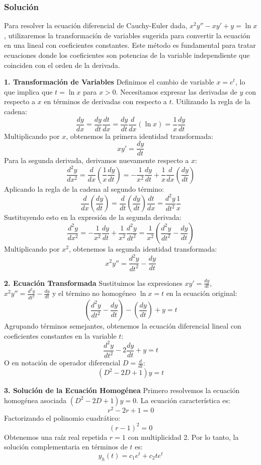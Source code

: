 \documentclass[a4paper]{article}
\begin{document}
\subsubsection{Solución}
Para resolver la ecuación diferencial de Cauchy-Euler dada, $x^2y'' - xy' + y = \ln x$, utilizaremos la transformación de variables sugerida para convertir la ecuación en una lineal con coeficientes constantes. Este método es fundamental para tratar ecuaciones donde los coeficientes son potencias de la variable independiente que coinciden con el orden de la derivada.

\textbf{1. Transformación de Variables}
Definimos el cambio de variable $x = e^t$, lo que implica que $t = \ln x$ para $x > 0$. Necesitamos expresar las derivadas de $y$ con respecto a $x$ en términos de derivadas con respecto a $t$. Utilizando la regla de la cadena:
$$
\frac{dy}{dx} = \frac{dy}{dt} \frac{dt}{dx} = \frac{dy}{dt} \frac{d}{dx}(\ln x) = \frac{1}{x} \frac{dy}{dt}
$$
Multiplicando por $x$, obtenemos la primera identidad transformada:
$$
x y' = \frac{dy}{dt}
$$
Para la segunda derivada, derivamos nuevamente respecto a $x$:
$$
\frac{d^2y}{dx^2} = \frac{d}{dx} \left( \frac{1}{x} \frac{dy}{dt} \right) = -\frac{1}{x^2} \frac{dy}{dt} + \frac{1}{x} \frac{d}{dx} \left( \frac{dy}{dt} \right)
$$
Aplicando la regla de la cadena al segundo término:
$$
\frac{d}{dx} \left( \frac{dy}{dt} \right) = \frac{d}{dt} \left( \frac{dy}{dt} \right) \frac{dt}{dx} = \frac{d^2y}{dt^2} \frac{1}{x}
$$
Sustituyendo esto en la expresión de la segunda derivada:
$$
\frac{d^2y}{dx^2} = -\frac{1}{x^2} \frac{dy}{dt} + \frac{1}{x^2} \frac{d^2y}{dt^2} = \frac{1}{x^2} \left( \frac{d^2y}{dt^2} - \frac{dy}{dt} \right)
$$
Multiplicando por $x^2$, obtenemos la segunda identidad transformada:
$$
x^2 y'' = \frac{d^2y}{dt^2} - \frac{dy}{dt}
$$

\textbf{2. Ecuación Transformada}
Sustituimos las expresiones $x y' = \frac{dy}{dt}$, $x^2 y'' = \frac{d^2y}{dt^2} - \frac{dy}{dt}$ y el término no homogéneo $\ln x = t$ en la ecuación original:
$$
\left( \frac{d^2y}{dt^2} - \frac{dy}{dt} \right) - \left( \frac{dy}{dt} \right) + y = t
$$
Agrupando términos semejantes, obtenemos la ecuación diferencial lineal con coeficientes constantes en la variable $t$:
$$
\frac{d^2y}{dt^2} - 2\frac{dy}{dt} + y = t
$$
O en notación de operador diferencial $D = \frac{d}{dt}$:
$$
(D^2 - 2D + 1)y = t
$$

\textbf{3. Solución de la Ecuación Homogénea}
Primero resolvemos la ecuación homogénea asociada $(D^2 - 2D + 1)y = 0$. La ecuación característica es:
$$
r^2 - 2r + 1 = 0
$$
Factorizando el polinomio cuadrático:
$$
(r - 1)^2 = 0
$$
Obtenemos una raíz real repetida $r = 1$ con multiplicidad 2. Por lo tanto, la solución complementaria en términos de $t$ es:
$$
y_h(t) = c_1 e^{t} + c_2 t e^{t}
$$
\end{document}
